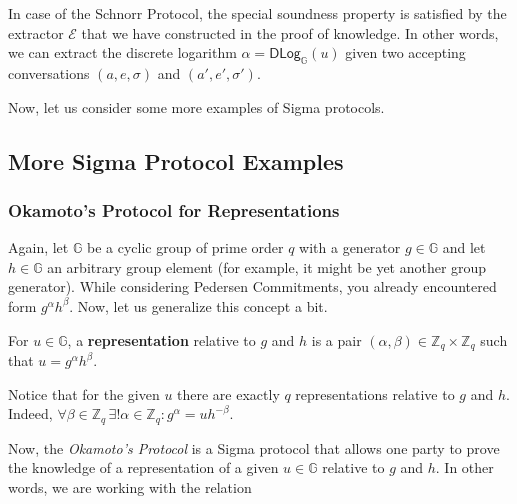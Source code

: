\documentclass[../lecture-notes-105x135.tex]{subfiles}
\begin{document}
\begin{example}
    In case of the Schnorr Protocol, the special soundness property is satisfied by the extractor $\mathcal{E}$ that we have constructed in the proof of knowledge. In other words, we can extract the discrete logarithm $\alpha = \mathsf{DLog}_{\mathbb{G}}(u)$ given two accepting conversations $(a,e,\sigma)$ and $(a',e',\sigma')$.
\end{example}

Now, let us consider some more examples of Sigma protocols.

\subsection{More Sigma Protocol Examples}

\subsubsection{Okamoto's Protocol for Representations}

Again, let $\mathbb{G}$ be a cyclic group of prime order $q$ with a generator $g \in \mathbb{G}$ and let $h \in \mathbb{G}$ an arbitrary group element (for example, it might be yet another group generator). While considering Pedersen Commitments, you already encountered form $g^{\alpha}h^{\beta}$. Now, let us generalize this concept a bit.

\begin{definition}
    For $u \in \mathbb{G}$, a \textbf{representation} relative to $g$ and $h$ is a pair $(\alpha,\beta) \in \mathbb{Z}_q \times \mathbb{Z}_q$ such that $u=g^{\alpha}h^{\beta}$.
\end{definition}

\begin{remark}
    Notice that for the given $u$ there are exactly $q$ representations relative to $g$ and $h$. Indeed, $\forall \beta \in \mathbb{Z}_q \, \exists! \alpha \in \mathbb{Z}_q: g^{\alpha} = uh^{-\beta}$. 
\end{remark}

\vspace{-1mm}

Now, the \textit{Okamoto's Protocol} is a Sigma protocol that allows one party to prove the knowledge of a representation of a given $u \in \mathbb{G}$ relative to $g$ and $h$. In other words, we are working with the relation

\vspace{-1mm}
\end{document}
